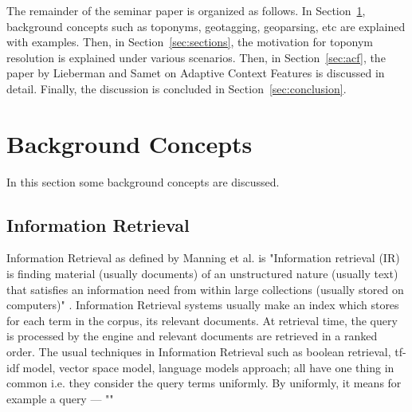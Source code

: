 \documentclass[
     11pt,         %
     a4paper,      %
     oneside,
     ]{article}
\begin{document}
The remainder of the seminar paper is organized as follows. In Section~\ref{sec:background_concepts}, background concepts such as toponyms, geotagging, geoparsing, etc are explained with examples.
Then, in Section~\ref{sec:sections}, the motivation for toponym resolution is explained under various scenarios. Then, in Section~\ref{sec:acf}, the paper by Lieberman and Samet \cite{Lieberman12adaptivecontext} on Adaptive Context Features is discussed in detail. Finally, the discussion is concluded in Section~\ref{sec:conclusion}.

\section{Background Concepts}\label{sec:background_concepts}
In this section some background concepts are discussed.

\subsection{Information Retrieval}
Information Retrieval as defined by Manning et al. is "Information retrieval (IR) is finding material (usually documents) of an unstructured nature (usually text) that satisfies an information need from within large collections (usually stored on computers)" \cite{Manning:2008:IIR:1394399}. Information Retrieval systems usually make an index which stores for each term in the corpus, its relevant documents. At retrieval time, the query is processed by the engine and relevant documents are retrieved in a ranked order. The usual techniques in Information Retrieval such as boolean retrieval, tf-idf model, vector space model, language models approach; all have one thing in common i.e. they consider the query terms uniformly.  By uniformly, it means for example a query --- ""
\end{document}
